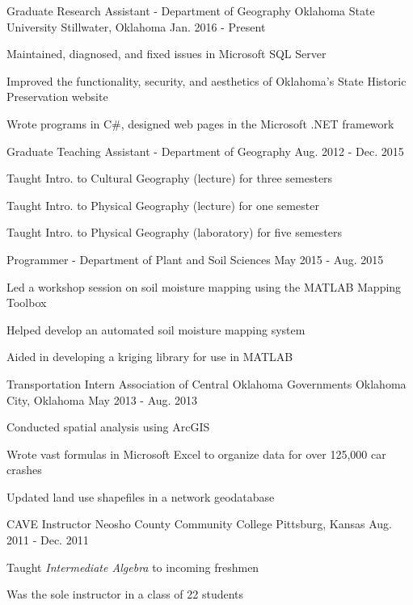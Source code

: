 \begin{cventries}
  \cventry
    {Graduate Research Assistant - Department of Geography}
    {Oklahoma State University}
    {Stillwater, Oklahoma}
    {Jan. 2016 - Present}
    {
      \begin{cvitems}
        \item {Maintained, diagnosed, and fixed issues in Microsoft SQL Server}
        \item {Improved the functionality, security, and aesthetics of Oklahoma's State Historic Preservation website}
        \item {Wrote programs in C\#, designed web pages in the Microsoft .NET framework}
      \end{cvitems}
    }
  \cventry
    {Graduate Teaching Assistant - Department of Geography}
    {}
    {}
    {Aug. 2012 - Dec. 2015}
    {
      \begin{cvitems}
        \item {Taught Intro. to Cultural Geography (lecture) for three semesters}
        \item {Taught Intro. to Physical Geography (lecture) for one semester}
        \item {Taught Intro. to Physical Geography (laboratory) for five semesters}
      \end{cvitems}
    }
  \cventry
    {Programmer - Department of Plant and Soil Sciences}
    {}
    {}
    {May 2015 - Aug. 2015}
    {
      \begin{cvitems}
        \item {Led a workshop session on soil moisture mapping using the MATLAB Mapping Toolbox}
        \item {Helped develop an automated soil moisture mapping system}
        \item {Aided in developing a kriging library for use in MATLAB}
      \end{cvitems}
    }
  \cventry
    {Transportation Intern}
    {Association of Central Oklahoma Governments}
    {Oklahoma City, Oklahoma}
    {May 2013 - Aug. 2013}
    {
      \begin{cvitems}
        \item {Conducted spatial analysis using ArcGIS}
        \item {Wrote vast formulas in Microsoft Excel to organize data for over 125,000 car crashes}
        \item {Updated land use shapefiles in a network geodatabase}
      \end{cvitems}
    }
  \cventry
    {CAVE Instructor}
    {Neosho County Community College}
    {Pittsburg, Kansas}
    {Aug. 2011 - Dec. 2011}
    {
      \begin{cvitems}
        \item {Taught \textit{Intermediate Algebra} to incoming freshmen}
        \item {Was the sole instructor in a class of 22 students}
      \end{cvitems}
    }
    

\end{cventries}

